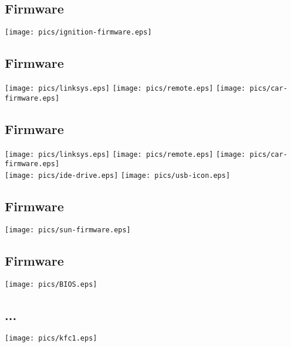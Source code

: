 \documentclass[xga]{xdvislides}
\begin{document}
\subsection{Firmware}
\begin{center}
	\texttt{[image: pics/ignition-firmware.eps]}
\end{center}

\subsection{Firmware}
\begin{center}
	\texttt{[image: pics/linksys.eps]}
	\texttt{[image: pics/remote.eps]}
	\texttt{[image: pics/car-firmware.eps]}
\end{center}

\subsection{Firmware}
\begin{center}
	\texttt{[image: pics/linksys.eps]}
	\texttt{[image: pics/remote.eps]}
	\texttt{[image: pics/car-firmware.eps]} \\
	\texttt{[image: pics/ide-drive.eps]}
	\texttt{[image: pics/usb-icon.eps]}
\end{center}



\subsection{Firmware}
\begin{center}
	\texttt{[image: pics/sun-firmware.eps]}
\end{center}

\subsection{Firmware}
\begin{center}
	\texttt{[image: pics/BIOS.eps]}
\end{center}

\subsection{...}
\begin{center}
	\texttt{[image: pics/kfc1.eps]}
\end{center}
\end{document}
